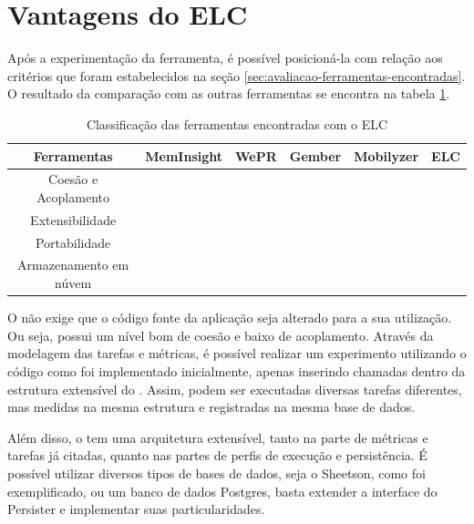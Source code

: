 \documentclass[12pt]{tcc}
\newcommand{\cmark}{\ding{51}}
\newcommand{\xmark}{\ding{55}}
\begin{document}
\section{Vantagens do ELC}
\label{subsection:classificando-o-elc}

\par Após a experimentação da ferramenta, é possível posicioná-la com relação aos critérios que foram estabelecidos na seção \ref{sec:avaliacao-ferramentas-encontradas}. O resultado da comparação com as outras ferramentas se encontra na tabela \ref{table:classificacao-com-elc}.

\begin{table}[ht]
\caption{Classificação das ferramentas encontradas com o ELC} %
\centering %
\begin{tabular}{c c c c c c} %
\toprule %

\textbf{Ferramentas} &\textbf{MemInsight} & \textbf{WePR} & \textbf{Gember} & \textbf{Mobilyzer} & \textbf{ELC}  \\ [0.4ex]

\midrule %
Coesão e Acoplamento & \cmark & \cmark & \cmark & \cmark  & \cmark  \\ 
Extensibilidade & \xmark & \xmark & \xmark & \xmark  & \cmark \\
Portabilidade & \cmark & \xmark & \xmark & \xmark  & \cmark \\
Armazenamento em núvem & \xmark & \cmark & \cmark & \cmark & \cmark  \\
\bottomrule %
\end{tabular}
\label{table:classificacao-com-elc} %
\end{table}

O  não exige que o código fonte da aplicação seja alterado para a sua utilização. Ou seja, possui um nível bom de coesão e baixo de acoplamento. Através da modelagem das tarefas e métricas, é possível realizar um experimento utilizando o código como foi implementado inicialmente, apenas inserindo chamadas dentro da estrutura extensível do . Assim, podem ser executadas diversas tarefas diferentes, mas medidas na mesma estrutura e registradas na mesma base de dados.

Além disso, o  tem uma arquitetura extensível, tanto na parte de métricas e tarefas já citadas, quanto nas partes de perfis de execução e persistência. É possível utilizar diversos tipos de bases de dados, seja o Sheetson, como foi exemplificado, ou um banco de dados Postgres, basta extender a interface do Persister e implementar suas particularidades. 
\end{document}
